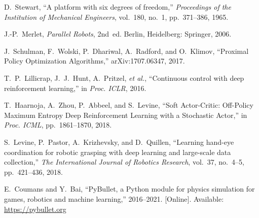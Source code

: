 \documentclass[conference]{IEEEtran}
\begin{document}
\begin{thebibliography}{00}

D.~Stewart, ``A platform with six degrees of freedom,'' \emph{Proceedings of the Institution of Mechanical Engineers}, vol.~180, no.~1, pp.~371--386, 1965.

J.-P.~Merlet, \emph{Parallel Robots}, 2nd~ed. Berlin, Heidelberg: Springer, 2006.

J.~Schulman, F.~Wolski, P.~Dhariwal, A.~Radford, and O.~Klimov, ``Proximal Policy Optimization Algorithms,'' arXiv:1707.06347, 2017.

T.~P.~Lillicrap, J.~J.~Hunt, A.~Pritzel, \emph{et al.}, ``Continuous control with deep reinforcement learning,'' in \emph{Proc. ICLR}, 2016.

T.~Haarnoja, A.~Zhou, P.~Abbeel, and S.~Levine, ``Soft Actor-Critic: Off-Policy Maximum Entropy Deep Reinforcement Learning with a Stochastic Actor,'' in \emph{Proc. ICML}, pp.~1861--1870, 2018.

S.~Levine, P.~Pastor, A.~Krizhevsky, and D.~Quillen, ``Learning hand-eye coordination for robotic grasping with deep learning and large-scale data collection,'' \emph{The International Journal of Robotics Research}, vol.~37, no.~4--5, pp.~421--436, 2018.

E.~Coumans and Y.~Bai, ``PyBullet, a Python module for physics simulation for games, robotics and machine learning,'' 2016--2021. [Online]. Available: \url{https://pybullet.org}
\end{thebibliography}
\end{document}
